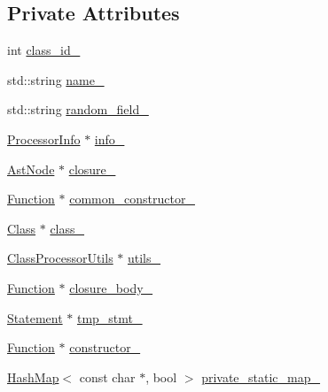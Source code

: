 \subsection*{Private Attributes}
\begin{DoxyCompactItemize}
\item 
int \hyperlink{classmocha_1_1_class_processor_a48fe8c1d4ebd2e18be5ecedf1618af80}{class\_\-id\_\-}
\item 
std::string \hyperlink{classmocha_1_1_class_processor_a6cee088c1f255c143fcba53994102461}{name\_\-}
\item 
std::string \hyperlink{classmocha_1_1_class_processor_abb72577e164ec690e69e29d555aab92d}{random\_\-field\_\-}
\item 
\hyperlink{classmocha_1_1_processor_info}{ProcessorInfo} $\ast$ \hyperlink{classmocha_1_1_class_processor_a4306a92ebfbd33320b8a485b0c420f27}{info\_\-}
\item 
\hyperlink{classmocha_1_1_ast_node}{AstNode} $\ast$ \hyperlink{classmocha_1_1_class_processor_aeb64e1570c436c65ed98c3c1274799d6}{closure\_\-}
\item 
\hyperlink{classmocha_1_1_function}{Function} $\ast$ \hyperlink{classmocha_1_1_class_processor_ab5674a30639efa457b81aabe2cc7778d}{common\_\-constructor\_\-}
\item 
\hyperlink{classmocha_1_1_class}{Class} $\ast$ \hyperlink{classmocha_1_1_class_processor_a15511bef8f5889e25f65d39d9f23d5df}{class\_\-}
\item 
\hyperlink{classmocha_1_1_class_processor_utils}{ClassProcessorUtils} $\ast$ \hyperlink{classmocha_1_1_class_processor_ad51b7e60254b3eeaea78992996d00bcd}{utils\_\-}
\item 
\hyperlink{classmocha_1_1_function}{Function} $\ast$ \hyperlink{classmocha_1_1_class_processor_a224ba4a0c7686ccf21161a02550bf713}{closure\_\-body\_\-}
\item 
\hyperlink{classmocha_1_1_statement}{Statement} $\ast$ \hyperlink{classmocha_1_1_class_processor_a5b61b8872052d21ab40c071951871f99}{tmp\_\-stmt\_\-}
\item 
\hyperlink{classmocha_1_1_function}{Function} $\ast$ \hyperlink{classmocha_1_1_class_processor_a58b2732fd5cca6a818c342585c67aff6}{constructor\_\-}
\item 
\hyperlink{classmocha_1_1_hash_map}{HashMap}$<$ const char $\ast$, bool $>$ \hyperlink{classmocha_1_1_class_processor_a13be0d8b8aa75a5058b8521925a9d74b}{private\_\-static\_\-map\_\-}
\end{DoxyCompactItemize}


